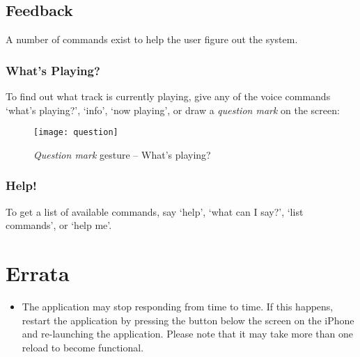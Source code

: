 \documentclass[12pt,letterpaper]{article}
\begin{document}
\subsection*{Feedback}
A number of commands exist to help the user figure out the system.
\subsubsection*{What's Playing?}
To find out what track is currently playing, give any of the voice commands `what's playing?', `info', `now playing',  or draw a \emph{question mark} on the screen:
\begin{figure}[H]
	\centering
	\texttt{[image: question]}
	\caption{\emph{Question mark} gesture -- What's playing?}
\end{figure}
\subsubsection*{Help!}
To get a list of available commands, say `help', `what can I say?', `list commands', or `help me'.



\section{Errata}
\begin{itemize}
\item The application may stop responding from time to time. If this happens, restart the application by pressing the button below the screen on the iPhone and re-launching the application. Please note that it may take more than one reload to become functional.
\end{itemize}
\end{document}
